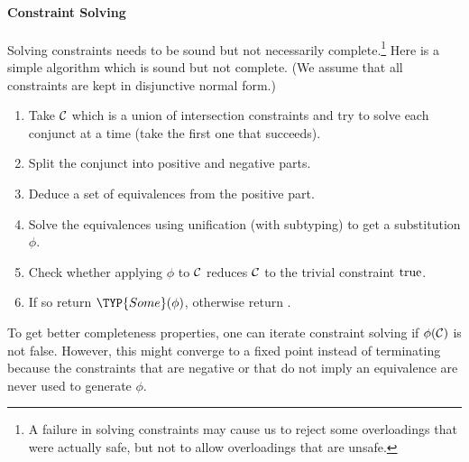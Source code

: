 \paragraph{Constraint Solving}
Solving constraints
needs to be sound but not necessarily complete.\footnote{A 
failure in solving constraints may cause us to reject some overloadings that
were actually safe, 
but not to allow overloadings that are unsafe.}
Here is a simple algorithm which is sound but not complete. (We assume that all
constraints are kept in disjunctive normal form.)
\begin{enumerate}
\item Take $\mathcal{C}$ which is a union of intersection constraints and
try to solve each conjunct at a time (take the first one that succeeds).
\item Split the conjunct into positive and negative parts.
\item Deduce a set of equivalences from the positive part.
\item Solve the equivalences using unification (with subtyping) to get a substitution $\phi$.
\item Check whether applying $\phi$ to $\mathcal{C}$ reduces $\mathcal{C}$ to the trivial constraint 
$\textrm{true}$.
\item If so return $\TYP{Some}(\phi)$, otherwise return .
\end{enumerate}
To get better completeness properties,
one can iterate constraint solving if $\phi(\mathcal{C})$ is not false.
However, this might converge to a fixed point instead of terminating
because the constraints that are negative or that do not imply an equivalence
are never used to generate $\phi$.
